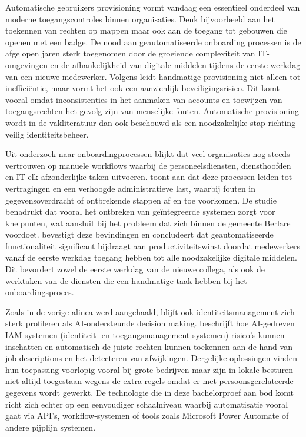 
Automatische gebruikers provisioning vormt vandaag een essentieel onderdeel van moderne toegangscontroles binnen organisaties. Denk bijvoorbeeld aan het toekennen van rechten op mappen maar ook aan de toegang tot gebouwen die openen met een badge. De nood aan geautomatiseerde onboarding processen is de afgelopen jaren sterk toegenomen door de groeiende complexiteit van IT-omgevingen en de afhankelijkheid van digitale middelen tijdens de eerste werkdag van een nieuwe medewerker. Volgens \textcite{Okta2025} leidt handmatige provisioning niet alleen tot inefficiëntie, maar vormt het ook een aanzienlijk beveiligingsrisico. Dit komt vooral omdat inconsistenties in het aanmaken van accounts en toewijzen van toegangsrechten het gevolg zijn van menselijke fouten. Automatische provisioning wordt in de vakliteratuur dan ook beschouwd als een noodzakelijke stap richting veilig identiteitsbeheer.

Uit onderzoek naar onboardingprocessen blijkt dat veel organisaties nog steeds vertrouwen op manuele workflows waarbij de personeelsdiensten, diensthoofden en IT elk afzonderlijke taken uitvoeren. \textcite{Radev2023} toont aan dat deze processen leiden tot vertragingen en een verhoogde administratieve last, waarbij fouten in gegevensoverdracht of ontbrekende stappen af en toe voorkomen. De studie benadrukt dat vooral het ontbreken van geïntegreerde systemen zorgt voor knelpunten, wat aansluit bij het probleem dat zich binnen de gemeente Berlare voordoet. \textcite{Vitla2023} bevestigt deze bevindingen en concludeert dat geautomatiseerde functionaliteit significant bijdraagt aan productiviteitswinst doordat medewerkers vanaf de eerste werkdag toegang hebben tot alle noodzakelijke digitale middelen. Dit bevordert zowel de eerste werkdag van de nieuwe collega, als ook de werktaken van de diensten die een handmatige taak hebben bij het onboardingsproces. 

Zoals in de vorige alinea werd aangehaald, blijft ook identiteitsmanagement zich sterk profileren als AI-ondersteunde decision making. \textcite{Hariharan2025} beschrijft hoe AI-gedreven IAM-systemen (identiteit- en toegangsmanagement systemen) risico's kunnen inschatten en automatisch de juiste rechten kunnen toekennen aan de hand van job descriptions en het detecteren van afwijkingen. Dergelijke oplossingen vinden hun toepassing voorlopig vooral bij grote bedrijven maar zijn in lokale besturen niet altijd toegestaan wegens de extra regels omdat er met persoonsgerelateerde gegevens wordt gewerkt. De technologie die in deze bachelorproef aan bod komt richt zich echter op een eenvoudiger schaalniveau waarbij automatisatie vooral gaat via API's, workflow-systemen of tools zoals Microsoft Power Automate of andere pijplijn systemen.

